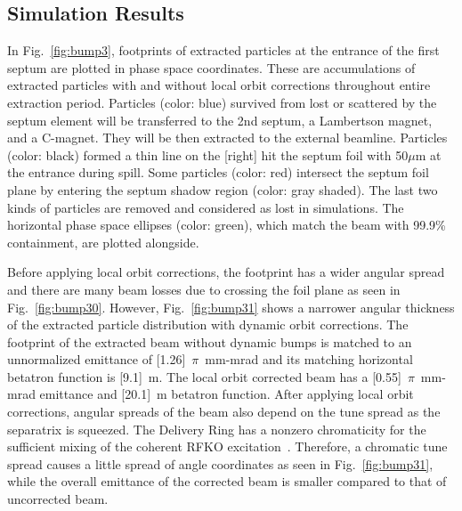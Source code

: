 \documentclass[aps,prstab,onecolumn,preprint,endfloats,11pt]{revtex4-1}
\begin{document}
\subsection{\label{sec:bump2}Simulation Results}

In Fig.~\ref{fig:bump3}, footprints of extracted particles at the entrance of the first septum are plotted in phase space coordinates.
These are accumulations of extracted particles with and without local orbit corrections throughout entire extraction period.
Particles (color: blue) survived from lost or scattered by the septum element will be transferred to the 2nd septum, a Lambertson magnet, and a C-magnet.
They will be then extracted to the external beamline.
Particles (color: black) formed a thin line on the [right] hit the septum foil with 50$\mu$m at the entrance during spill.
Some particles (color: red) intersect the septum foil plane by entering the septum shadow region (color: gray shaded).
The last two kinds of particles are removed and considered as lost in simulations.
The horizontal phase space ellipses (color: green), which match the beam with 99.9\% containment, are plotted alongside.

Before applying local orbit corrections, the footprint has a wider angular spread and there are many beam losses due to crossing the foil plane as seen in Fig.~\ref{fig:bump30}.
However, Fig.~\ref{fig:bump31} shows a narrower angular thickness of the extracted particle distribution with dynamic orbit corrections.
The footprint of the extracted beam without dynamic bumps is matched to an unnormalized emittance of [1.26]~$\pi$~mm-mrad and its matching horizontal betatron function is [9.1]~m. The local orbit corrected beam has a [0.55]~$\pi$~mm-mrad emittance and [20.1]~m betatron function.
After applying local orbit corrections, angular spreads of the beam also depend on the tune spread as the separatrix is squeezed.
The Delivery Ring has a nonzero chromaticity for the sufficient mixing of the coherent RFKO excitation~\cite{ipac11}.
Therefore, a chromatic tune spread causes a little spread of angle coordinates as seen in Fig.~\ref{fig:bump31}, while the overall emittance of the corrected beam is smaller compared to that of uncorrected beam.
\end{document}
